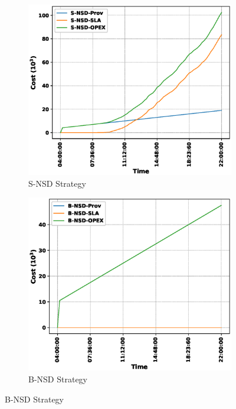 \documentclass[conference, final]{IEEEtran}
\begin{document}
{\begin{figure}
\begin{subfigure}[h]{0.32\linewidth}
\includegraphics[width=\linewidth]{./figures/S-NSDcost_trace.eps}
\caption{{\textsf{S-NSD}} Strategy}
\end{subfigure}
\hfill
\begin{subfigure}[h]{0.32\linewidth}
\includegraphics[width=\linewidth]{./figures/B-NSDcost_trace.eps}
\caption{{\textsf{B-NSD}} Strategy}
\end{subfigure}

\end{figure}}
\end{document}
